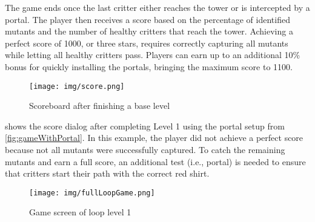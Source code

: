 The game ends once the last critter either reaches the tower or is intercepted by a portal. The player then receives a score based on the percentage of identified mutants and the number of healthy critters that reach the tower. Achieving a perfect score of 1000, or three stars, requires correctly capturing all mutants while letting all healthy critters pass. Players can earn up to an additional 10\% bonus for quickly installing the portals, bringing the maximum score to 1100.

\begin{figure}
	\centering
	\texttt{[image: img/score.png]}
	\caption{Scoreboard after finishing a base level}
	\label{fig:baseScoreDialog}
\end{figure}


 shows the score dialog after completing Level 1 using the portal setup from \cref{fig:gameWithPortal}. In this example, the player did not achieve a perfect score because not all mutants were successfully captured. To catch the remaining mutants and earn a full score, an additional test (i.e., portal) is needed to ensure that critters start their path with the correct red shirt.
%

\begin{figure*}
	\centering
	\texttt{[image: img/fullLoopGame.png]}
	\caption{Game screen of loop level 1}
	\label{fig:loopLevel1screen}
\end{figure*}

